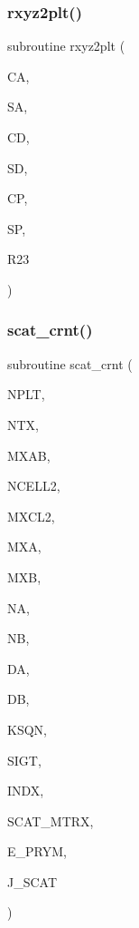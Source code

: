 \subsubsection{\texorpdfstring{rxyz2plt()}{rxyz2plt()}}
{\footnotesize\ttfamily subroutine rxyz2plt (\begin{DoxyParamCaption}\item[{real}]{CA,  }\item[{real}]{SA,  }\item[{real}]{CD,  }\item[{real}]{SD,  }\item[{real}]{CP,  }\item[{real}]{SP,  }\item[{real, dimension(2,3)}]{R23 }\end{DoxyParamCaption})}

\mbox{\label{Leroi__c_8f90_aef77ff6f17e654fc7f89a638ad1d2d46}} 
\subsubsection{\texorpdfstring{scat\+\_\+crnt()}{scat\_crnt()}}
{\footnotesize\ttfamily subroutine scat\+\_\+crnt (\begin{DoxyParamCaption}\item[{integer, intent(in)}]{N\+P\+LT,  }\item[{integer, intent(in)}]{N\+TX,  }\item[{integer, intent(in)}]{M\+X\+AB,  }\item[{integer, dimension(0\+:nplt), intent(in)}]{N\+C\+E\+L\+L2,  }\item[{integer, intent(in)}]{M\+X\+C\+L2,  }\item[{integer, intent(in)}]{M\+XA,  }\item[{integer, intent(in)}]{M\+XB,  }\item[{integer, dimension(nplt), intent(in)}]{NA,  }\item[{integer, dimension(nplt), intent(in)}]{NB,  }\item[{real, dimension(nplt), intent(in)}]{DA,  }\item[{real, dimension(nplt), intent(in)}]{DB,  }\item[{complex, intent(in)}]{K\+S\+QN,  }\item[{complex, dimension(nplt), intent(in)}]{S\+I\+GT,  }\item[{integer, dimension(mxcl2), intent(in)}]{I\+N\+DX,  }\item[{complex, dimension(mxcl2,mxcl2), intent(in)}]{S\+C\+A\+T\+\_\+\+M\+T\+RX,  }\item[{complex, dimension(2,mxab,ntx,nplt), intent(in)}]{E\+\_\+\+P\+R\+YM,  }\item[{complex, dimension(2,mxab,ntx,nplt), intent(out)}]{J\+\_\+\+S\+C\+AT }\end{DoxyParamCaption})}


